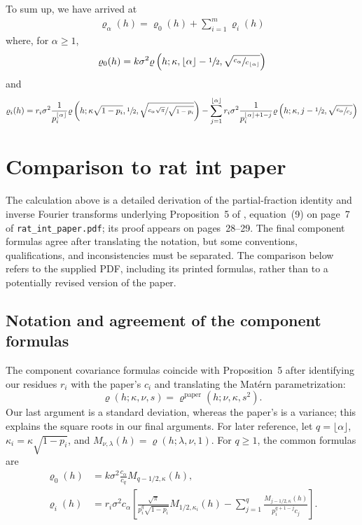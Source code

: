 \documentclass[11pt,a4paper]{article}
\theoremstyle{plain}
\theoremstyle{definition}
\begin{document}
To sum up, we have arrived at
\begin{align}
   \varrho_\alpha(h) = \varrho_0(h) + \sum_{i=1}^m  \varrho_i(h)
\end{align}
where, for $\alpha\geq1$,
\begin{align}
   \varrho_0(h) =  k\sigma^2\varrho\left(h;\kappa, \lfloor\alpha\rfloor-\sfrac{1}{2}, \sqrt{\sfrac{c_\alpha}{c_{\lfloor\alpha\rfloor}}}\right)
\end{align}
and 
\begin{align}
    \varrho_i(h) = r_i\sigma^2\dfrac{1}{p_i^{\lfloor\alpha\rfloor}} \varrho\left(h;\kappa\sqrt{1-p_i}, \sfrac{1}{2}, \sqrt{\sfrac{c_\alpha\sqrt{\pi}}{\sqrt{1-p_i}}}\right) -  \sum_{j=1}^{\lfloor\alpha\rfloor} r_i\sigma^2\dfrac{1}{p_i^{\lfloor\alpha\rfloor+1-j}}\varrho\left(h;\kappa, j-\sfrac{1}{2}, \sqrt{\sfrac{c_\alpha}{c_j}}\right)
\end{align}




\section{Comparison to rat int paper}

The calculation above is a detailed derivation of the partial-fraction
identity and inverse Fourier transforms underlying Proposition~5 of
\cite{Bolin2025Linear}, equation~(9) on page~7 of
\texttt{rat\_int\_paper.pdf}; its proof appears on pages~28--29.
The final component formulas agree after translating the notation, but
some conventions, qualifications, and inconsistencies must be separated.
The comparison below refers to the supplied PDF, including its printed
formulas, rather than to a potentially revised version of the paper.

\subsection{Notation and agreement of the component formulas}

The component covariance formulas coincide with Proposition~5 after
identifying our residues $r_i$ with the paper's $c_i$ and translating
the Mat\'ern parametrization:
\begin{equation}
\varrho(h;\kappa,\nu,s)
=\varrho^{\mathrm{paper}}(h;\nu,\kappa,s^2).
\end{equation}
Our last argument is a standard deviation, whereas the paper's is a
variance; this explains the square roots in our final arguments.
For later reference, let $q=\lfloor\alpha\rfloor$,
$\kappa_i=\kappa\sqrt{1-p_i}$, and
$M_{\nu,\lambda}(h)=\varrho(h;\lambda,\nu,1)$. For $q\geq1$, the
common formulas are
\begin{align}
\varrho_0(h)
&=k\sigma^2\frac{c_\alpha}{c_q}M_{q-1/2,\kappa}(h),
\label{eq:comparison_rho0}\\
\varrho_i(h)
&=r_i\sigma^2c_\alpha\left[
 \frac{\sqrt{\pi}}{p_i^q\sqrt{1-p_i}}M_{1/2,\kappa_i}(h)
 -\sum_{j=1}^q\frac{M_{j-1/2,\kappa}(h)}{p_i^{q+1-j}c_j}
 \right].
\label{eq:comparison_rhoi}
\end{align}
\end{document}
